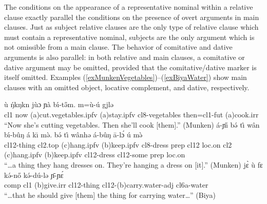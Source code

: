 \documentclass[10pt,twoside]{article}
\makeatletter
\def\ci#1{{\ipaFont #1}}
\newcommand{\gl}[1]{`#1'}
\newcommand{\cl}[1]{{\sc cl#1}}
\newcommand{\pref}[1]{(\ref{#1})}
\newcommand{\rref}[2]{\pref{#1}--\pref{#2}}
\def\ML#1{#1\symbol{"1DC6}} %
\def\LM{\textlowrise}
\newcommand\Lbi{\ipabar{\ipaclap{\i}{\rotatebox{0}{\emph{\raisebox{.06em}{\`{}}}}}}{.5ex}{1.1}{}{}}
\newcommand\Hbi{\ipabar{\ipaclap{\i}{\rotatebox{0}{\emph{\raisebox{.06em}{\'{}}}}}}{.5ex}{1.1}{}{}}
\renewcommand{\i}{ı}
\def\@{ə}
\def\eh{ɛ}
\def\aw{ɔ}
\def\ng{ŋ}
\def\ny{ɲ}
\makeatother
\begin{document}
The conditions on the appearance of a representative nominal
within a relative clause exactly parallel the conditions on the presence
of overt arguments in main clauses.
Just as subject relative clauses are the only type of relative clause which
must contain a representative nominal, subjects are the only argument
which is not omissible from a main clause.
The behavior of comitative and dative arguments is also parallel: in
both relative and main clauses, a comitative or dative argument may be
omitted, provided that the comitative/dative
%
marker is itself omitted. Examples \rref{exMunkenVegetables}{exBiyaWater}
show main clauses with an omitted object, locative complement, and dative,
respectively.
%
%
\begin{exe}
\ex \label{exMunkenVegetables}
\gll \`u {\'\ng}k\Hbi\ng{k\Lbi}n j\`u{\aw} \ny\`a b\'\i-t\H{\@}m. m=\`u-\'u gj\LM{\eh}l{\@}	\\
\cl1 now ({\sc a})cut.vegetables.{\sc ipfv} ({\sc a})stay.{\sc ipfv} \cl8-vegetables then=\cl1-{\sc fut} ({\sc a})cook.{\sc irr}	\\
\glt ``Now she's cutting vegetables. Then she'll cook [them].'' (Munken) \label{mg04} %
\ex	\label{exMunkenDresses}
%
\gll \'a-\ny\H{\i} b\'{\@} t\^{\i} w\^an b\'\i-b\^u{\ng} \'a k\={\i} m\`{\@}. b\'{\@} t\^{\i} w\^anh{\@}
\'a-b\^u{\ng} \=a-l\'{\aw} \'u{\footnotemark}  m\`{\@}	\\
\cl12-thing \cl2.{\sc top} ({\sc c})hang.{\sc ipfv} ({\sc b})keep.{\sc ipfv} \cl8-dress {\sc prep} \cl12 {\sc loc.}on \cl2
({\sc c})hang.{\sc ipfv} ({\sc b})keep.{\sc ipfv} \cl12-dress \cl12-some {\sc prep} {\sc loc.}on	\\
\glt ``\dots a thing they hang dresses on. They're hanging a dress on [it].'' (Munken)	%
%
\ex	\label{exBiyaWater}
\gll j\`{\eh} \`u f\ML{\eh} k\'{\@}-n\H{o} k\'{\@}-d\'u-l{\@} \={\ny}-\ny\'{\eh} 	\\
{\sc comp} \cl1 ({\sc b})give.{\sc irr} \cl12-thing \cl12-({\sc b})carry.water-{\sc adj} \cl6a-water	\\
\glt ``\dots that he should give [them] the thing for carrying water\dots'' (Biya)	%
\end{exe}
%
%
\end{document}
